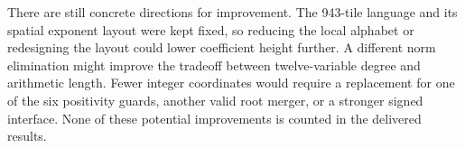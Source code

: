 There are still concrete directions for improvement.  The 943-tile
language and its spatial exponent layout were kept fixed, so reducing
the local alphabet or redesigning the layout could lower coefficient
height further.  A different norm elimination might improve the tradeoff
between twelve-variable degree and arithmetic length.  Fewer integer
coordinates would require a replacement for one of the six positivity
guards, another valid root merger, or a stronger signed interface.
None of these potential improvements is counted in the delivered results.

